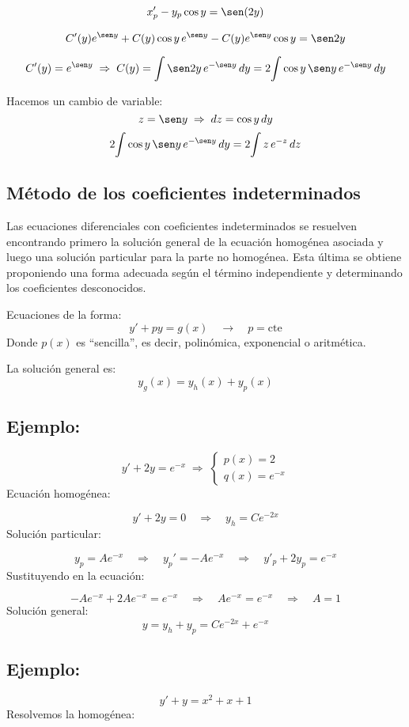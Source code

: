 \documentclass[a4paper,12pt]{article}
\begin{document}
\[
x_p'-y_p\cos y=\sen(2y)
\]

\[
C'(y)e^{\sen y}+C(y)\cos y\,e^{\sen y}-C(y)e^{\sen y}\cos y=\sen 2y
\]

\[
 C'(y) = e^{\sen y}
 \;\Rightarrow\; C(y) = \int \sen 2y\,e^{-\sen y}\,dy  = 2\!\int \cos y\,\sen y\,e^{-\sen y}\,dy
\]

\newpage
\noindent
Hacemos un cambio de variable:
\[
z = \sen y \;\Rightarrow\; dz = \cos y\, dy
\]
\[
2\!\int \cos y\,\sen y\,e^{-\sen y}\,dy
=2\!\int z\,e^{-z}\,dz
\]

\subsection{Método de los coeficientes indeterminados}
\noindent
Las ecuaciones diferenciales con coeficientes indeterminados se 
resuelven encontrando primero la solución general de la ecuación 
homogénea asociada y luego una solución particular para la parte no 
homogénea. Esta última se obtiene proponiendo una forma adecuada 
según el término independiente y determinando los coeficientes desconocidos.

\medskip
\noindent
Ecuaciones de la forma:
\[
y' + p y = g(x) \quad \rightarrow \quad p = \text{cte}
\]
Donde $p(x)$ es “sencilla”, es decir, polinómica, exponencial o aritmética.

\medskip
\noindent
La solución general es:
\[
y_g(x)=y_h(x)+y_p(x)
\]
\subsection*{Ejemplo:}
\vspace{-1.2em}
\[
y' + 2y = e^{-x}
\;\Rightarrow\;
\begin{cases}
p(x) = 2 \\[4pt]
q(x) = e^{-x}
\end{cases}
\]
Ecuación homogénea:

\[
y' + 2y = 0 \quad \Rightarrow \quad y_h = C e^{-2x}
\]
Solución particular:

\[
y_p = A e^{-x} 
\quad \Rightarrow \quad y_p' = -A e^{-x}
\quad \Rightarrow \quad y'_p+2y_p = e^{-x}
\]
Sustituyendo en la ecuación:

\[
-A e^{-x} + 2A e^{-x} = e^{-x}
\quad \Rightarrow \quad
Ae^{-x} = e^{-x} 
\quad \Rightarrow \quad
A = 1
\]
Solución general:
\[
y = y_h + y_p = C e^{-2x} + e^{-x}
\]
\subsection*{Ejemplo:}
\vspace{-1.2em}
\[
y' + y = x^2 + x + 1
\]
Resolvemos la homogénea:
\end{document}
